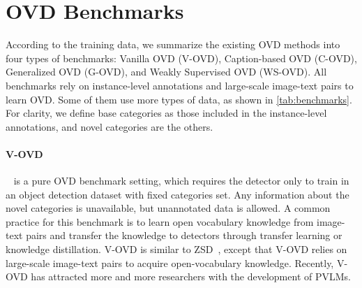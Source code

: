 \documentclass[10pt,twocolumn,letterpaper]{article}
\begin{document}
\section{OVD Benchmarks}
\label{sec:ovd_benchmarks}

According to the training data, we summarize the existing OVD methods into four types of benchmarks: Vanilla OVD (V-OVD), Caption-based OVD (C-OVD), Generalized OVD (G-OVD), and Weakly Supervised OVD (WS-OVD).
All benchmarks rely on instance-level annotations and large-scale image-text pairs to learn OVD.
Some of them use more types of data, as shown in \cref{tab:benchmarks}.
For clarity, we define base categories as those included in the instance-level annotations, and novel categories are the others.

\begin{table}[t]
  \centering
  \caption{
    Summary of OVD benchmarks.
    ``Caption'': in-domain captions like COCO-Captions.
    ``Category Prior'': human priors on novel categories.
    ``Image Label'': image-level category labels.
  }
  \label{tab:benchmarks}
\end{table}
 
\paragraph{V-OVD}~\cite{vild, detpro, regionclip, glip, mdetr, x_detr, owl_vit, detclip} is a pure OVD benchmark setting, which requires the detector only to train in an object detection dataset with fixed categories set.
Any information about the novel categories is unavailable, but unannotated data is allowed.
A common practice for this benchmark is to learn open vocabulary knowledge from image-text pairs and transfer the knowledge to detectors through transfer learning or knowledge distillation.
V-OVD is similar to ZSD~\cite{zsd, contrast_zsd, zs_yolo, transductive_zsd}, except that V-OVD relies on large-scale image-text pairs to acquire open-vocabulary knowledge.
Recently, V-OVD has attracted more and more researchers with the development of PVLMs.
\end{document}

